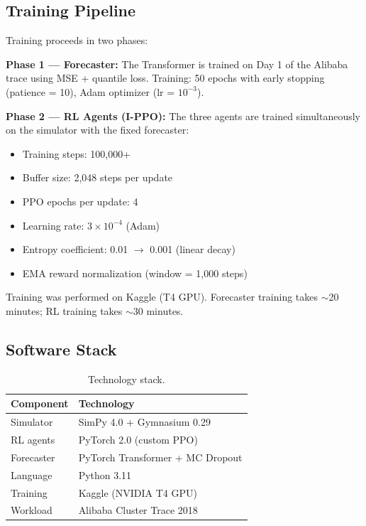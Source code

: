 \documentclass[12pt,a4paper]{article}
\begin{document}
\subsection{Training Pipeline}

Training proceeds in two phases:

\textbf{Phase 1 --- Forecaster:} The Transformer is trained on Day 1 of the
Alibaba trace using MSE + quantile loss. Training: 50 epochs with early
stopping (patience = 10), Adam optimizer (lr = $10^{-3}$).

\textbf{Phase 2 --- RL Agents (I-PPO):} The three agents are trained
simultaneously on the simulator with the fixed forecaster:
\begin{itemize}
  \item Training steps: 100,000+
  \item Buffer size: 2,048 steps per update
  \item PPO epochs per update: 4
  \item Learning rate: $3 \times 10^{-4}$ (Adam)
  \item Entropy coefficient: 0.01 $\rightarrow$ 0.001 (linear decay)
  \item EMA reward normalization (window = 1,000 steps)
\end{itemize}

Training was performed on Kaggle (T4 GPU). Forecaster training takes
${\sim}$20 minutes; RL training takes ${\sim}$30 minutes.

\subsection{Software Stack}

\begin{table}[H]
\centering
\caption{Technology stack.}
\begin{tabular}{ll}
\toprule
\textbf{Component} & \textbf{Technology} \\
\midrule
Simulator & SimPy 4.0 + Gymnasium 0.29 \\
RL agents & PyTorch 2.0 (custom PPO) \\
Forecaster & PyTorch Transformer + MC Dropout \\
Language & Python 3.11 \\
Training & Kaggle (NVIDIA T4 GPU) \\
Workload & Alibaba Cluster Trace 2018 \\
\bottomrule
\end{tabular}
\end{table}
\end{document}
